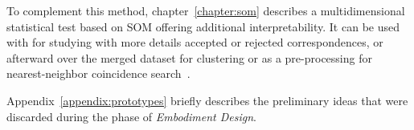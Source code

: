 To complement this method, chapter~\ref{chapter:som} describes a multidimensional
statistical test based on \gls{SOM} offering additional interpretability. It can be
used with \PresQ for studying with more details accepted or rejected correspondences,
or afterward over the merged dataset for clustering or as a pre-processing for nearest-neighbor
coincidence search~\cite{silva2011som}.

Appendix~\ref{appendix:prototypes} briefly describes the preliminary ideas that were
discarded during the phase of \emph{Embodiment Design}.
